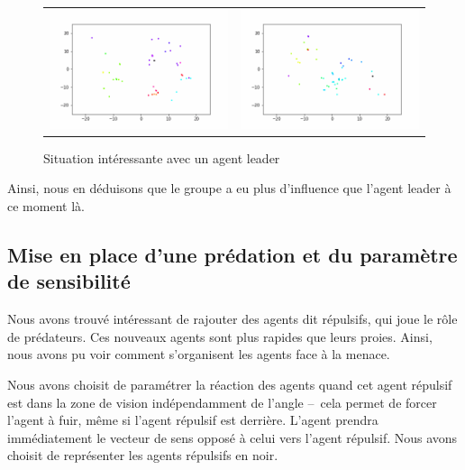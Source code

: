 \documentclass[french, a4paper, 12pt, openany]{report}
\begin{document}
       \begin{figure}[!h]
		\centering
		\begin{tabular}{cc}
			\includegraphics[width=8cm]{images/image_13.png} & \includegraphics[width=8cm]{images/image_14.png} \\
		\end{tabular}
		\caption{Situation intéressante avec un agent leader}
	\end{figure}
       
       Ainsi, nous en déduisons que le groupe a eu plus d'influence que l'agent leader à ce moment là.
       
       
   \subsection{Mise en place d'une prédation et du paramètre de sensibilité}
       
       Nous avons trouvé intéressant de rajouter des agents dit répulsifs, qui joue le rôle de prédateurs. Ces nouveaux agents sont plus rapides que leurs proies. Ainsi, nous avons pu voir comment s'organisent les agents face à la menace.
       
       Nous avons choisit de paramétrer la réaction des agents quand cet agent répulsif est dans la zone de vision indépendamment de l'angle –~cela permet de forcer l'agent à fuir, même si l'agent répulsif est derrière. L'agent prendra immédiatement le vecteur de sens opposé à celui vers l'agent répulsif. Nous avons choisit de représenter les agents répulsifs en noir.\\
       
\end{document}
